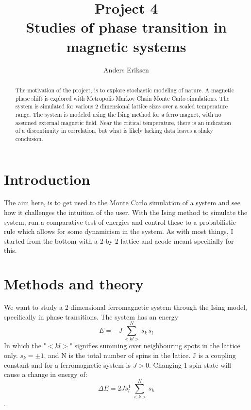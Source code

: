 \documentclass[10pt, twocolumn]{revtex4-1}
\begin{document}
\title{%
    Project 4\\
    \large Studies of phase transition in magnetic systems}
\author{Anders Eriksen}
\begin{abstract}
    The motivation of the project, is to explore stochastic modeling of nature.
    A magnetic phase shift is explored with Metropolis Markov Chain Monte Carlo simulations. The system is simulated for various $2$ dimensional lattice
    sizes over a scaled temperature range. The system is modeled using the Ising method for a ferro magnet, with no assumed external magnetic field.
    Near the critical temperature, there is an indication of a discontinuity in correlation, but what is likely lacking data leaves a shaky conclusion.
\end{abstract}
\maketitle

\section{Introduction}
The aim here, is to get used to the Monte Carlo simulation of a system and see how it challenges the intuition of the user. %
With the Ising method to simulate the system, run a comparative test of energies and control these to a probabilistic rule which
allows for some dynamicism in the system. %
As with most things, I started from the bottom with a 2 by 2 lattice and acode meant specifially for this. \cite{MortenIsingmodel}


\section{Methods and theory}

We want to study a 2 dimensional ferromagnetic system through the Ising model, specifically in phase transitions.
The system has an energy
\[ E = -J \sum_{<kl>}^N s_k \, s_l \]
In which the "$<kl>$" signifies summing over neighbouring spots in the lattice only. $s_k = \pm 1$, and N is the total number of spins in
the latice. J is a coupling constant and for a ferromagnetic system is $J > 0$.
Changing 1 spin state will cause a change in energy of:
\[ \Delta E = 2 Js_l^1 \sum_{<k>}^N s_k \].
\end{document}
